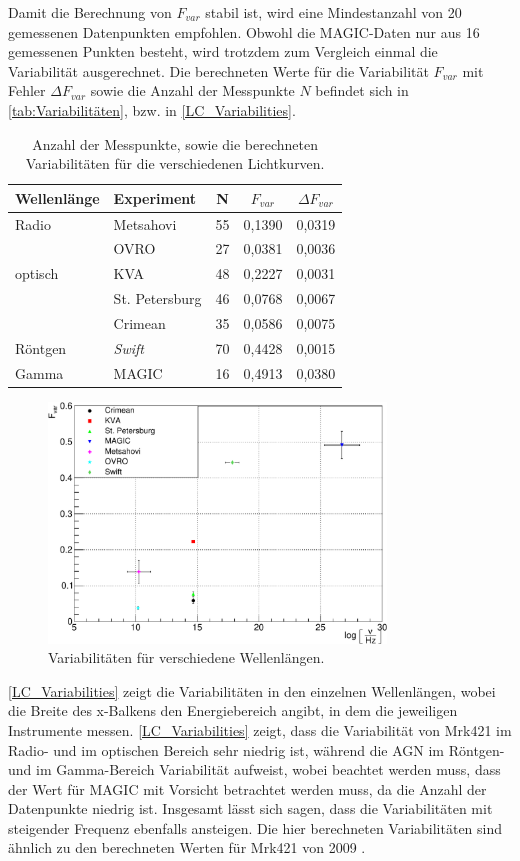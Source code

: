 Damit die Berechnung von $F_{var}$ stabil ist, wird eine Mindestanzahl von 20 gemessenen Datenpunkten empfohlen.
Obwohl die MAGIC-Daten nur aus 16 gemessenen Punkten besteht, wird trotzdem zum Vergleich einmal die Variabilität ausgerechnet.
Die berechneten Werte für die Variabilität $F_{var}$ mit Fehler $\Delta F_{var}$ sowie die Anzahl der Messpunkte $N$ befindet sich in \autoref{tab:Variabilitäten}, bzw. in \autoref{LC_Variabilities}.


\begin{table}[!h]
\centering
\caption{Anzahl der Messpunkte, sowie die berechneten Variabilitäten für die verschiedenen Lichtkurven.}
\label{tab:Variabilitäten}
\begin{tabular}{llccc}
  \toprule
  Wellenlänge & Experiment & N & $F_{var}$ & $\Delta F_{var}$\\
  \midrule
  \midrule
  Radio & Metsahovi & 55 & 0,1390 & 0,0319 \\
  &OVRO & 27 & 0,0381 & 0,0036 \\
  optisch &KVA & 48 & 0,2227 & 0,0031 \\
  &St. Petersburg & 46 & 0,0768 & 0,0067 \\
  &Crimean & 35 & 0,0586 & 0,0075 \\
  Röntgen & \textit{Swift} & 70 & 0,4428 & 0,0015\\
  Gamma & MAGIC & 16 & 0,4913 & 0,0380 \\
  \bottomrule
\end{tabular}
\end{table}


\begin{figure}
    \centering
    \includegraphics[width=0.8\textwidth]{./Plots/05_MWL/PlotVariabilities.pdf}
    \caption{Variabilitäten für verschiedene Wellenlängen.}
    \label{LC_Variabilities}
\end{figure}

\autoref{LC_Variabilities} zeigt die Variabilitäten in den einzelnen Wellenlängen, wobei die Breite des x-Balkens den Energiebereich angibt, in dem die jeweiligen Instrumente messen.
\autoref{LC_Variabilities} zeigt, dass die Variabilität von Mrk421 im Radio- und im optischen Bereich sehr niedrig ist, während die AGN im Röntgen- und im Gamma-Bereich Variabilität aufweist, wobei beachtet werden muss, dass der Wert für MAGIC mit Vorsicht betrachtet werden muss, da die Anzahl der Datenpunkte niedrig ist.
Insgesamt lässt sich sagen, dass die Variabilitäten mit steigender Frequenz ebenfalls ansteigen.
Die hier berechneten Variabilitäten sind ähnlich zu den berechneten Werten für Mrk421 von 2009 \cite{MWL2009}.
